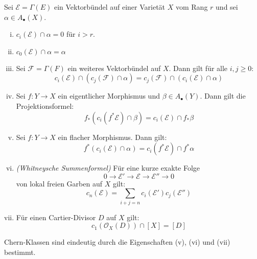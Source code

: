 \documentclass[10pt,a4paper]{article}
\begin{document}
\begin{proposition}
Sei $\mathcal{E} = \Gamma(E)$ ein Vektorbündel auf einer Varietät $X$ vom Rang $r$ und sei $\alpha\in A_\bullet(X)$.
\begin{enumerate}[(i)]
\item $c_i(\mathcal{E})\cap \alpha = 0$ für $i > r$.
\item $c_0(\mathcal{E})\cap \alpha = \alpha$
\item Sei $\mathcal{F} = \Gamma(F)$ ein weiteres Vektorbündel auf $X$. Dann gilt für alle $i,j\geq 0$:
\[ c_i(\mathcal{E})\cap (c_j(\mathcal{F}) \cap \alpha) = c_j(\mathcal{F}) \cap (c_i(\mathcal{E})\cap \alpha) \]
\item Sei $f:Y\to X$ ein eigentlicher Morphismus und $\beta\in A_\bullet(Y)$. Dann gilt die Projektionsformel:
\[ f_\ast(c_i(f^\ast\mathcal{E})\cap\beta) = c_i(\mathcal{E})\cap f_\ast\beta \]
\item Sei $f:Y\to X$ ein flacher Morphismus. Dann gilt:
\[ f^\ast(c_i(\mathcal{E})\cap \alpha) = c_i(f^\ast\mathcal{E})\cap f^\ast\alpha \]
\item \textit{(Whitneysche Summenformel)} Für eine kurze exakte Folge 
\[ 0\longrightarrow\mathcal{E}'\longrightarrow\mathcal{E}\longrightarrow \mathcal{E}''\longrightarrow 0 \]
von lokal freien Garben auf $X$ gilt:
\[ c_n(\mathcal{E}) = \sum_{i+j = n}c_i(\mathcal{E}')c_j(\mathcal{E}'') \]
\item Für einen Cartier-Divisor $D$ auf $X$ gilt:
\[ c_1(\mathcal{O}_X(D))\cap [X] = [D] \]
\end{enumerate}
\end{proposition}

\begin{remark}
Chern-Klassen sind eindeutig durch die Eigenschaften (v), (vi) und (vii) bestimmt.
\end{remark}
\end{document}

